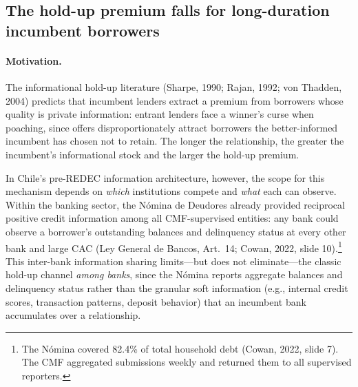 \documentclass[12pt]{article}
\theoremstyle{plain}
\theoremstyle{plain}
\begin{document}
\subsection{The hold-up premium falls for long-duration incumbent borrowers}

\paragraph{Motivation.} The informational hold-up literature (Sharpe, 1990; Rajan, 1992; von Thadden, 2004) predicts that incumbent lenders extract a premium from borrowers whose quality is private information: entrant lenders face a winner's curse when poaching, since offers disproportionately attract borrowers the better-informed incumbent has chosen not to retain. The longer the relationship, the greater the incumbent's informational stock and the larger the hold-up premium.

In Chile's pre-REDEC information architecture, however, the scope for this mechanism depends on \textit{which} institutions compete and \textit{what} each can observe. Within the banking sector, the N\'omina de Deudores already provided reciprocal positive credit information among all CMF-supervised entities: any bank could observe a borrower's outstanding balances and delinquency status at every other bank and large CAC (Ley General de Bancos, Art.\ 14; Cowan, 2022, slide 10).\footnote{The N\'omina covered 82.4\% of total household debt (Cowan, 2022, slide 7). The CMF aggregated submissions weekly and returned them to all supervised reporters.} This inter-bank information sharing limits---but does not eliminate---the classic hold-up channel \textit{among banks}, since the N\'omina reports aggregate balances and delinquency status rather than the granular soft information (e.g., internal credit scores, transaction patterns, deposit behavior) that an incumbent bank accumulates over a relationship.
\end{document}
